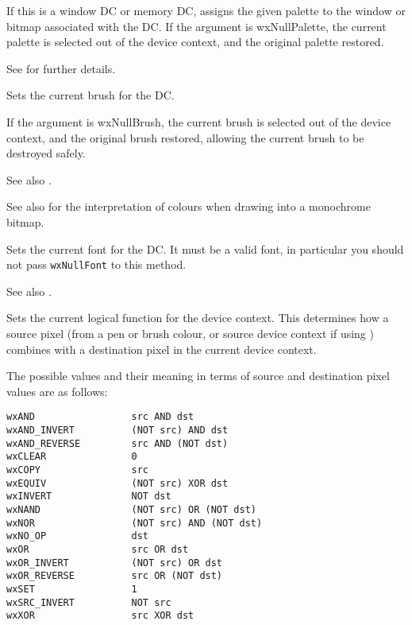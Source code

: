 
If this is a window DC or memory DC, assigns the given palette to the window
or bitmap associated with the DC. If the argument is wxNullPalette, the current
palette is selected out of the device context, and the original palette
restored.

See  for further details.


\label{wxdcsetbrush}


Sets the current brush for the DC.

If the argument is wxNullBrush, the current brush is selected out of the device
context, and the original brush restored, allowing the current brush to
be destroyed safely.

See also .

See also  for the interpretation of colours
when drawing into a monochrome bitmap.


\label{wxdcsetfont}


Sets the current font for the DC. It must be a valid font, in particular you
should not pass {\tt wxNullFont} to this method.

See also .


\label{wxdcsetlogicalfunction}


Sets the current logical function for the device context.  This determines how
a source pixel (from a pen or brush colour, or source device context if
using ) combines with a destination pixel in the
current device context.

The possible values
and their meaning in terms of source and destination pixel values are
as follows:

\begin{verbatim}
wxAND                 src AND dst
wxAND_INVERT          (NOT src) AND dst
wxAND_REVERSE         src AND (NOT dst)
wxCLEAR               0
wxCOPY                src
wxEQUIV               (NOT src) XOR dst
wxINVERT              NOT dst
wxNAND                (NOT src) OR (NOT dst)
wxNOR                 (NOT src) AND (NOT dst)
wxNO_OP               dst
wxOR                  src OR dst
wxOR_INVERT           (NOT src) OR dst
wxOR_REVERSE          src OR (NOT dst)
wxSET                 1
wxSRC_INVERT          NOT src
wxXOR                 src XOR dst
\end{verbatim}

